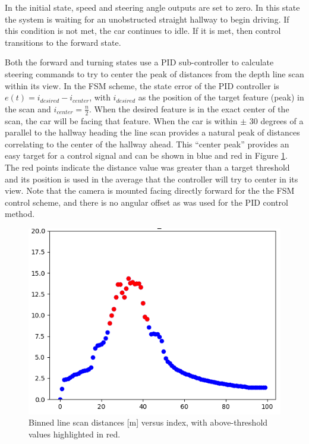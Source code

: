 \documentclass[letterpaper, 10 pt, conference]{ieeeconf}  %
\begin{document}
In the initial state, speed and steering angle outputs are set to zero.  In this state the system is waiting for an unobstructed straight hallway to begin driving.  If this condition is not met, the car continues to idle.  If it is met, then control transitions to the forward state.

Both the forward and turning states use a PID sub-controller to calculate steering commands to try to center the peak of distances from the depth line scan within its view.  In the FSM scheme, the state error of the PID controller is $e(t) = i_{desired} - i_{center}$, with $i_{desired}$ as the position of the target feature (peak) in the scan and $i_{center} = \frac{n}{2}$.  When the desired feature is in the exact center of the scan, the car will be facing that feature.  When the car is within $\pm$ 30 degrees of a parallel to the hallway heading the line scan provides a natural peak of distances correlating to the center of the hallway ahead. This ``center peak'' provides an easy target for a control signal and can be shown in blue and red in Figure \ref{redPoints}. The red points indicate the distance value was greater than a target threshold and its position is used in the average that the controller will try to center in its view.  Note that the camera is mounted facing directly forward for the the FSM control scheme, and there is no angular offset as was used for the PID control method.

\begin{figure}[h]
    \centering
    \includegraphics[width=\columnwidth]{Figures/redPeak.png}
    \caption{Binned line scan distances [m] versus index, with above-threshold values highlighted in red.}
    \label{redPoints}
\end{figure}
\end{document}
